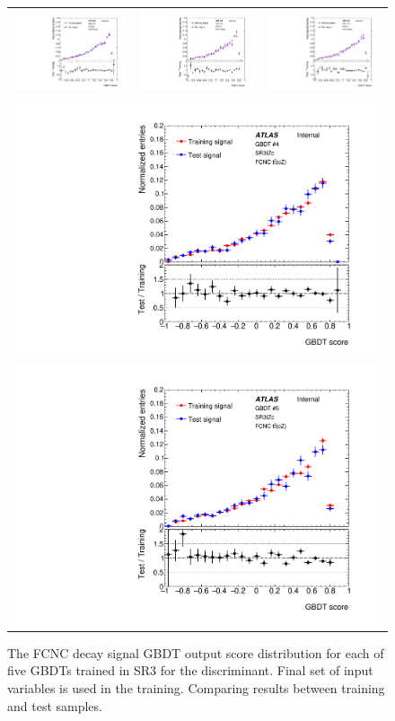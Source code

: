 \begin{figure}[!htbp]
	\centering
	\begin{tabular}{ccc}
		\includegraphics[width=.3\textwidth]{Chapters/CH6/figures/SR3_UsingSMT/BDT/GBDT_signal_Fold1} &
		\includegraphics[width=.3\textwidth]{Chapters/CH6/figures/SR3_UsingSMT/BDT/GBDT_signal_Fold2} &
		\includegraphics[width=.3\textwidth]{Chapters/CH6/figures/SR3_UsingSMT/BDT/GBDT_signal_Fold3} \\
		\multicolumn{3}{c}{
			\includegraphics[width=.3\textwidth]{Chapters/CH6/figures/SR3_UsingSMT/BDT/GBDT_signal_Fold4}
			\includegraphics[width=.3\textwidth]{Chapters/CH6/figures/SR3_UsingSMT/BDT/GBDT_signal_Fold5}} \\
	\end{tabular}
	\caption{ The FCNC \ttbar decay signal GBDT output score distribution for each of five GBDTs trained in SR3 for the \Dthree discriminant.
		Final set of input variables is used in the training.
		Comparing results between training and test samples.
	}%
	\label{app:BDT:fig:SR3:GBDTsigFinalSet}
\end{figure}


